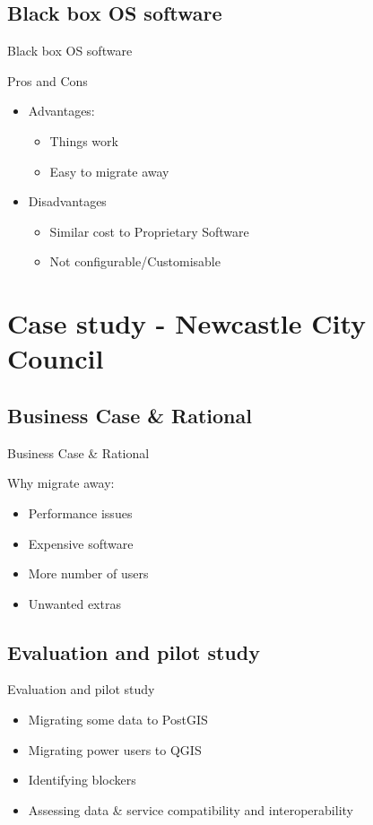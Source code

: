 \subsection{Black box OS software}
\begin{frame}{Black box OS software}
	\begin{block}{Pros and Cons}
		\begin{itemize}
			\item Advantages:
			\begin{itemize}
				\item Things work
				\item Easy to migrate away
			\end{itemize}
			\item Disadvantages
			\begin{itemize}
				\item Similar cost to Proprietary Software
				\item Not configurable/Customisable
			\end{itemize}
		\end{itemize}
	\end{block}
\end{frame}

\section{Case study - Newcastle City Council}
\subsection{Business Case \& Rational}
\begin{frame}{Business Case \& Rational}
	\begin{block}{Why migrate away:}
		\begin{itemize}
			\item Performance issues
			\item Expensive software
			\item More number of users
			\item Unwanted extras
		\end{itemize}
	\end{block}
\end{frame}

\subsection{Evaluation and pilot study}
\begin{frame}{Evaluation and pilot study}
	\begin{block}{}
		\begin{itemize}
			\item Migrating some data to PostGIS
			\item Migrating power users to QGIS
			\item Identifying blockers
			\item Assessing data \& service compatibility and interoperability
		\end{itemize}
	\end{block}
\end{frame}

